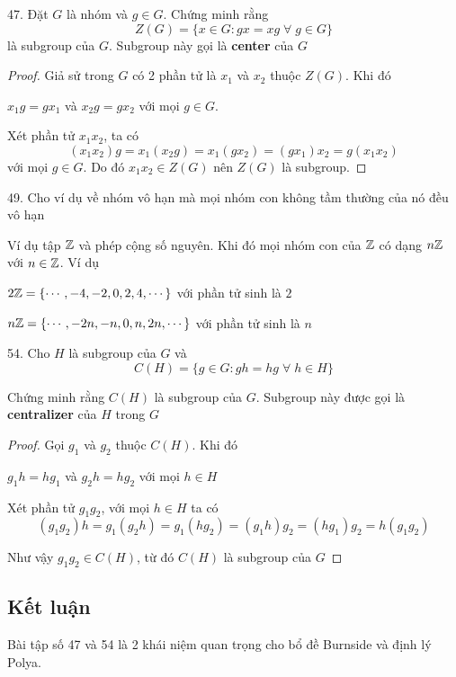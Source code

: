 47. Đặt $G$ là nhóm và $g \in G$. Chứng minh rằng $$Z(G) = \{ x \in G: gx = xg \; \forall \; g \in G \}$$ là subgroup của $G$. Subgroup này gọi là \textbf{center} của $G$

\begin{proof}
    Giả sử trong $G$ có 2 phần tử là $x_1$ và $x_2$ thuộc $Z(G)$. Khi đó

        $x_1 g = g x_1$ và $x_2 g = g x_2$ với mọi $g \in G$.

    Xét phần tử $x_1 x_2$, ta có
    $$(x_1 x_2) g = x_1 (x_2 g) = x_1 (g x_2) = (g x_1) x_2 = g (x_1 x_2)$$ với mọi $g \in G$. Do đó $x_1 x_2 \in Z(G)$ nên $Z(G)$ là subgroup.

\end{proof}

49. Cho ví dụ về nhóm vô hạn mà mọi nhóm con không tầm thường của nó đều vô hạn

Ví dụ tập $\mathbb{Z}$ và phép cộng số nguyên. Khi đó mọi nhóm con của $\mathbb{Z}$ có dạng $n\mathbb{Z}$ với $n \in \mathbb{Z}$. Ví dụ

$2\mathbb{Z} = \{\cdots, -4, -2, 0, 2, 4, \cdots\}$ với phần tử sinh là $2$

$n\mathbb{Z} = \{\cdots, -2n, -n, 0, n, 2n, \cdots\}$ với phần tử sinh là $n$

54. Cho $H$ là subgroup của $G$ và $$C(H) = \{g \in G: gh = hg \; \forall \; h \in H\}$$

Chứng minh rằng $C(H)$ là subgroup của $G$. Subgroup này được gọi là \textbf{centralizer} của $H$ trong $G$

\begin{proof}
    Gọi $g_1$ và $g_2$ thuộc $C(H)$. Khi đó

    $g_1 h = h g_1$ và $g_2 h = h g_2$ với mọi $h \in H$

    Xét phần tử $g_1 g_2$, với mọi $h \in H$ ta có
    $$(g_1 g_2) h = g_1 (g_2 h) = g_1 (h g_2) = (g_1 h) g_2 = (h g_1) g_2 = h (g_1 g_2)$$

    Như vậy $g_1 g_2 \in C(H)$, từ đó $C(H)$ là subgroup của $G$


\end{proof}

\subsection*{Kết luận}

Bài tập số 47 và 54 là 2 khái niệm quan trọng cho bổ đề Burnside và định lý Polya.
